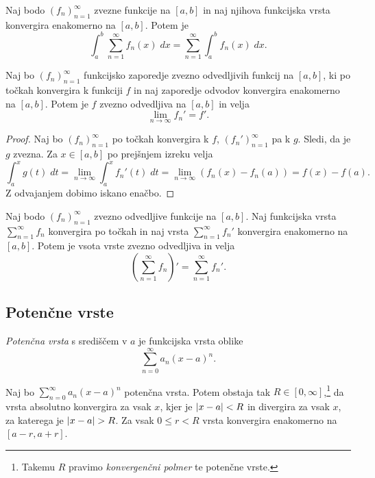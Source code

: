 \documentclass[12pt, a4paper]{article}
\begin{document}
\begin{posledica}
Naj bodo $(f_n)_{n=1}^\infty$ zvezne funkcije na $[a,b]$ in naj njihova funkcijska vrsta konvergira enakomerno na $[a,b]$. Potem je
\[
\int_a^b\sum_{n=1}^\infty f_n(x)\;dx=\sum_{n=1}^\infty\int_a^b f_n(x)\;dx.
\]
\end{posledica}

\begin{izrek}
Naj bo $(f_n)_{n=1}^\infty$ funkcijsko zaporedje zvezno odvedljivih funkcij na $[a,b]$, ki po točkah konvergira k funkciji $f$ in naj zaporedje odvodov konvergira enakomerno na $[a,b]$. Potem je $f$ zvezno odvedljiva na $[a,b]$ in velja
\[
\lim_{n\to\infty} f_n'=f'.
\]
\end{izrek}

\begin{proof}
Naj bo $(f_n)_{n=1}^\infty$ po točkah konvergira k $f$, $(f_n')_{n=1}^\infty$ pa k $g$. Sledi, da je $g$ zvezna. Za $x\in[a,b]$ po prejšnjem izreku velja
\[
\int_a^x g(t)\;dt=\lim_{n\to\infty}\int_a^xf_n'(t)\;dt=\lim_{n\to\infty}\left(f_n(x)-f_n(a)\right)=f(x)-f(a).
\]
Z odvajanjem dobimo iskano enačbo.
\end{proof}

\begin{posledica}
Naj bodo $(f_n)_{n=1}^\infty$ zvezno odvedljive funkcije na $[a,b]$. Naj funkcijska vrsta $\displaystyle\sum_{n=1}^\infty f_n$ konvergira po točkah in naj vrsta $\displaystyle\sum_{n=1}^\infty f_n'$ konvergira enakomerno na $[a,b]$. Potem je vsota vrste zvezno odvedljiva in velja
\[
\left(\sum_{n=1}^\infty f_n\right)'=\sum_{n=1}^\infty f_n'.
\]
\end{posledica}

\newpage

\subsection{Potenčne vrste}

\begin{okvir}
\begin{definicija}
\emph{Potenčna vrsta} s središčem v $a$ je funkcijska vrsta oblike
\[
\sum_{n=0}^\infty a_n(x-a)^n.
\]
\end{definicija}
\end{okvir}

\begin{izrek}
Naj bo $\displaystyle\sum_{n=0}^\infty a_n(x-a)^n$ potenčna vrsta. Potem obstaja tak $R\in[0,\infty]$,\footnote{Takemu $R$ pravimo \emph{konvergenčni polmer} te potenčne vrste.} da vrsta absolutno konvergira za vsak $x$, kjer je $\left\lvert x-a\right\rvert<R$ in divergira za vsak $x$, za katerega je $\left\lvert x-a\right\rvert>R$. Za vsak $0\leq r<R$ vrsta konvergira enakomerno na $[a-r,a+r]$.
\end{izrek}
\end{document}
